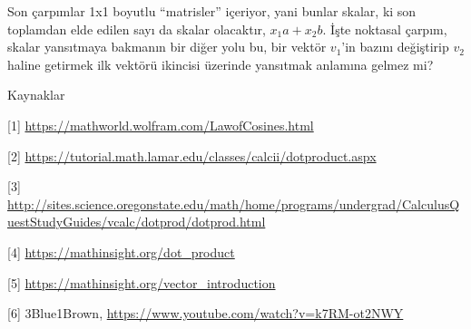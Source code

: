\documentclass[12pt,fleqn]{article}\usepackage{../../common}
\begin{document}
Son çarpımlar 1x1 boyutlu ``matrisler'' içeriyor, yani bunlar skalar, ki son
toplamdan elde edilen sayı da skalar olacaktır, $x_1 a + x_2 b$. İşte noktasal
çarpım, skalar yansıtmaya bakmanın bir diğer yolu bu, bir vektör $v_1$'in bazını
değiştirip $v_2$ haline getirmek ilk vektörü ikincisi üzerinde yansıtmak
anlamına gelmez mi? 

Kaynaklar

[1] \url{https://mathworld.wolfram.com/LawofCosines.html}

[2] \url{https://tutorial.math.lamar.edu/classes/calcii/dotproduct.aspx}

[3] \url{http://sites.science.oregonstate.edu/math/home/programs/undergrad/CalculusQuestStudyGuides/vcalc/dotprod/dotprod.html}

[4] \url{https://mathinsight.org/dot_product}

[5] \url{https://mathinsight.org/vector_introduction}

[6] 3Blue1Brown, \url{https://www.youtube.com/watch?v=k7RM-ot2NWY}
\end{document}

